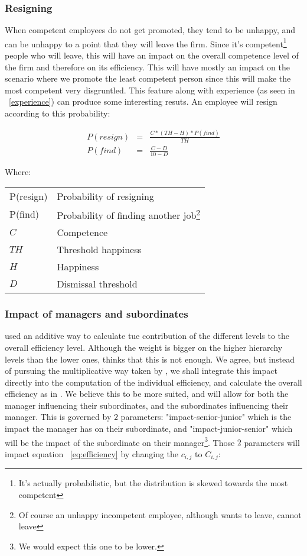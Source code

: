 \documentclass[11pt]{article}
\begin{document}
\subsubsection{Resigning}
\label{resign}
When competent employees do not get promoted, they tend to be unhappy, and can be unhappy to a point that they will leave the firm. Since it's competent\footnote{It's actually probabilistic, but the distribution is skewed towards the most competent} people who will leave, this will have an impact on the overall competence level of the firm and therefore on its efficiency. This will have mostly an impact on the scenario where we promote the least competent person since this will make the most competent very disgruntled. This feature along with experience (as seen in ~\ref{experience}) can produce some interesting resuts. An employee will resign according to this probability:

\begin{eqnarray}
P(resign) &=& \frac{C * (TH - H) * P(find)}{TH} \\
P(find)   &=& \frac{C - D}{10 - D}
\end{eqnarray}

Where:
\begin{tabular}{l l}
P(resign) & Probability of resigning \\
P(find)   & Probability of finding another job\footnote{Of course an unhappy incompetent employee, although wants to leave, cannot leave} \\
$C$ & Competence \\
$TH$ & Threshold happiness \\
$H$ & Happiness \\
$D$ & Dismissal threshold \\
\end{tabular}

\subsubsection{Impact of managers and subordinates}
\label{managersubord}
\cite{petercomp} used an additive way to calculate tue contribution of the different levels to the overall efficiency level. Although the weight is bigger on the higher hierarchy levels than the lower ones, \cite{dilbert-pete} thinks that this is not enough. We agree, but instead of pursuing the multiplicative way taken by \cite{dilbert-pete}, we shall integrate this impact directly into the computation of the individual efficiency, and calculate the overall efficiency as in \cite{petercomp}. We believe this to be more suited, and will allow for both the manager influencing their subordinates, and the subordinates influencing their manager. This is governed by $2$ parameters: "impact-senior-junior" which is the impact the manager has on their subordinate, and "impact-junior-senior" which will be the impact of the subordinate on their manager\footnote{We would expect this one to be lower.}. Those $2$ parameters will impact equation ~\ref{eq:efficiency} by changing the $c_{i,j}$ to $C_{i,j}$:
\end{document}
